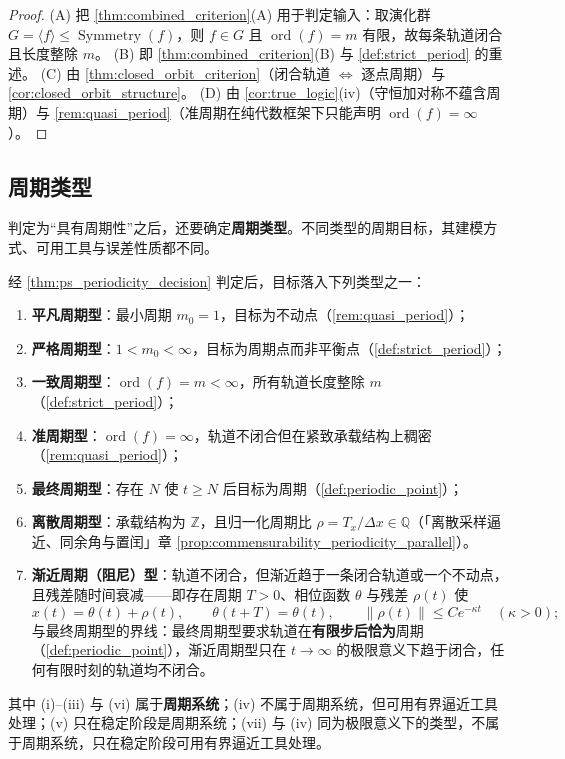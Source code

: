 \begin{proof}
(A) 把 \cref{thm:combined_criterion}(A) 用于判定输入：取演化群 $G=\langle f\rangle\le\operatorname{Symmetry}(f)$，则 $f\in G$ 且 $\operatorname{ord}(f)=m$ 有限，故每条轨道闭合且长度整除 $m$。
(B) 即 \cref{thm:combined_criterion}(B) 与 \cref{def:strict_period} 的重述。
(C) 由 \cref{thm:closed_orbit_criterion}（闭合轨道 $\iff$ 逐点周期）与 \cref{cor:closed_orbit_structure}。
(D) 由 \cref{cor:true_logic}(iv)（守恒加对称不蕴含周期）与 \cref{rem:quasi_period}（准周期在纯代数框架下只能声明 $\operatorname{ord}(f)=\infty$）。
\end{proof}

\subsection{周期类型}

判定为“具有周期性”之后，还要确定\textbf{周期类型}。不同类型的周期目标，其建模方式、可用工具与误差性质都不同。

\begin{definition}[周期类型]\label{def:ps_period_type}
经 \cref{thm:ps_periodicity_decision} 判定后，目标落入下列类型之一：
\begin{enumerate}[label=(\roman*)]
    \item \textbf{平凡周期型}：最小周期 $m_0=1$，目标为不动点（\cref{rem:quasi_period}）；
    \item \textbf{严格周期型}：$1<m_0<\infty$，目标为周期点而非平衡点（\cref{def:strict_period}）；
    \item \textbf{一致周期型}：$\operatorname{ord}(f)=m<\infty$，所有轨道长度整除 $m$（\cref{def:strict_period}）；
    \item \textbf{准周期型}：$\operatorname{ord}(f)=\infty$，轨道不闭合但在紧致承载结构上稠密（\cref{rem:quasi_period}）；
    \item \textbf{最终周期型}：存在 $N$ 使 $t\ge N$ 后目标为周期（\cref{def:periodic_point}）；
    \item \textbf{离散周期型}：承载结构为 $\mathbb{Z}$，且归一化周期比 $\rho=T_x/\Delta x\in\mathbb{Q}$（「离散采样逼近、同余角与置闰」章 \cref{prop:commensurability_periodicity_parallel}）。
    \item \textbf{渐近周期（阻尼）型}：轨道不闭合，但渐近趋于一条闭合轨道或一个不动点，且残差随时间衰减——即存在周期 $T>0$、相位函数 $\theta$ 与残差 $\rho(t)$ 使
    \[
    x(t)=\theta(t)+\rho(t),\qquad \theta(t+T)=\theta(t),\qquad \|\rho(t)\|\le Ce^{-\kappa t}\quad(\kappa>0);
    \]
    与最终周期型的界线：最终周期型要求轨道在\textbf{有限步后恰为}周期（\cref{def:periodic_point}），渐近周期型只在 $t\to\infty$ 的极限意义下趋于闭合，任何有限时刻的轨道均不闭合。
\end{enumerate}
其中 (i)--(iii) 与 (vi) 属于\textbf{周期系统}；(iv) 不属于周期系统，但可用有界逼近工具处理；(v) 只在稳定阶段是周期系统；(vii) 与 (iv) 同为极限意义下的类型，不属于周期系统，只在稳定阶段可用有界逼近工具处理。
\end{definition}

